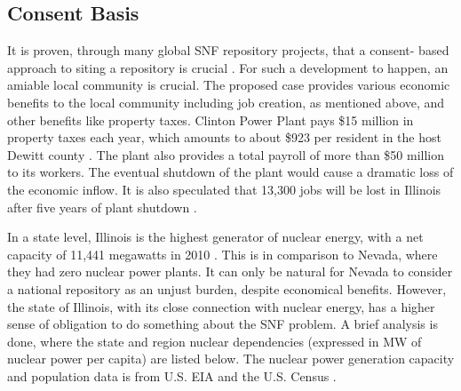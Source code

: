 \subsection{Consent Basis}
It is proven, through many global \gls{SNF} repository projects, that a consent-
based approach to siting a repository is crucial 
\cite{ayers_blue_2012,doe_designing_2016,jenkins-smith_public_2013,freeze_siting_2015}. 
For such a development to happen, an amiable local community is crucial. 
The proposed case provides various economic benefits to the local community including
job creation, as mentioned above, and other benefits like property taxes. Clinton
Power Plant pays \$15 million in property taxes each year, which amounts to about 
\$923 per resident in the host Dewitt county \cite{Brady-Lunny_2016}. The plant
also provides a total payroll of more than \$50 million to its workers.
The eventual shutdown of the plant would cause a dramatic loss of the economic inflow.
It is also speculated that 13,300 jobs will be lost in Illinois after five years 
of plant shutdown \cite{Reid_2014}.  

In a state level, Illinois is the highest generator of nuclear energy, with a net
capacity of 11,441 megawatts in 2010 \cite{EIA_2010}. This is in comparison to 
Nevada, where they had zero nuclear power plants. It can only be natural for Nevada
to consider a national repository as an unjust burden, despite economical benefits.
However, the state of Illinois, with its close connection with nuclear energy,
has a higher sense of obligation to do something about the \gls{SNF} problem.
A brief analysis is done, where the state and region nuclear dependencies (expressed
in MW of nuclear power per capita) are listed below. The nuclear power generation capacity
and population data is from U.S. \gls{EIA} \cite{EIA_2010} and the U.S. Census \cite{census}.


\begin{table}[h]
	
	\centering
	\caption {\gls{NMWPC} values for different states}

	\end{table}
	
